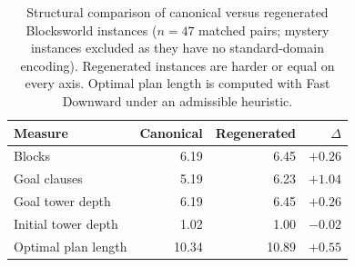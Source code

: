 \begin{table}[t]
\centering
\caption{Structural comparison of canonical versus regenerated Blocksworld instances
($n{=}47$ matched pairs; mystery instances excluded as they have no standard-domain encoding).
Regenerated instances are harder or equal on every axis. Optimal plan length is computed with
Fast Downward under an admissible heuristic.}
\label{tab:bw-structural}
\small
\begin{tabular}{lrrr}
\toprule
Measure & Canonical & Regenerated & $\Delta$ \\
\midrule
Blocks & 6.19 & 6.45 & $+0.26$ \\
Goal clauses & 5.19 & 6.23 & $+1.04$ \\
Goal tower depth & 6.19 & 6.45 & $+0.26$ \\
Initial tower depth & 1.02 & 1.00 & $-0.02$ \\
Optimal plan length & 10.34 & 10.89 & $+0.55$ \\
\bottomrule
\end{tabular}
\end{table}
